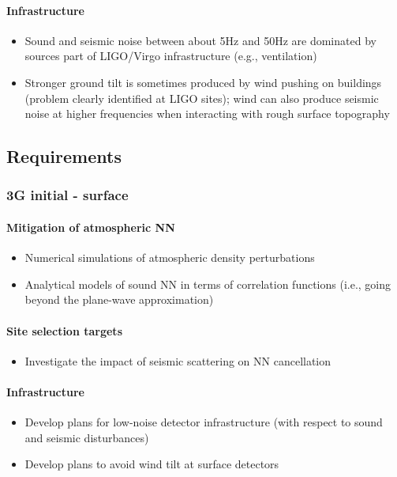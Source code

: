 \paragraph{Infrastructure}
\begin{itemize}
\item Sound and seismic noise between about 5Hz and 50Hz are dominated by sources part of LIGO/Virgo infrastructure (e.g., ventilation) 
\item Stronger ground tilt is sometimes produced by wind pushing on buildings (problem clearly identified at LIGO sites); wind can also produce seismic noise at higher frequencies when interacting with rough surface topography
\end{itemize}

\subsection{Requirements}
\subsubsection{3G initial - surface}
\paragraph{Mitigation of atmospheric NN}
\begin{itemize}
\item Numerical simulations of atmospheric density perturbations
\item Analytical models of sound NN in terms of correlation functions (i.e., going beyond the plane-wave approximation)
\end{itemize}

\paragraph{Site selection targets}
\begin{itemize}
\item Investigate the impact of seismic scattering on NN cancellation
\end{itemize}

\paragraph{Infrastructure}
\begin{itemize}
\item Develop plans for low-noise detector infrastructure (with respect to sound and seismic disturbances)
\item Develop plans to avoid wind tilt at surface detectors
\end{itemize}

